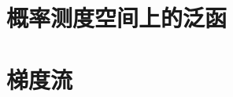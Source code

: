 \documentclass[UTF8,12pt]{ctexart}
\theoremstyle{plain}
\theoremstyle{definition}
\theoremstyle{plain}
\numberwithin{equation}{section}
\numberwithin{figure}{section}
\theoremstyle{boxedsource}
\theoremstyle{plain}
\begin{document}
\section[概率测度空间上的泛函]{概率测度空间上的泛函}\label{sec:7}





\setcounter{footnote}{0}
\section[梯度流]{梯度流}\label{sec:8}






\clearpage\nocite{*}

\end{document}
